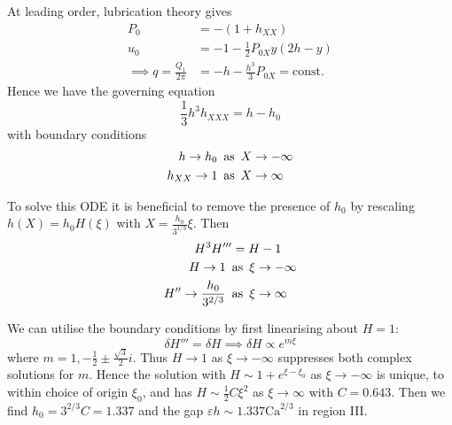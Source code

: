\documentclass{jknotes}
\begin{document}
\begin{center}
\end{center}
At leading order, lubrication theory gives
\begin{align}
	P_0 &= -(1+h_{XX}) \\
	u_0 &= -1 - \frac{1}{2} P_{0X} y(2h-y) \\
	\implies q = \frac{Q_1}{2\pi} &= -h-\frac{h^3}{3}P_{0X} = \text{const.}
\end{align}
Hence we have the governing equation
\begin{equation}
	\frac{1}{3} h^3 h_{XXX} = h-h_0
\end{equation}
with boundary conditions
\begin{align}
	h \to h_0 \hspace{.5em}&\text{as}\hspace{.5em} X \to -\infty \\
	h_{XX} \to 1\hspace{.5em} &\text{as}\hspace{.5em} X \to \infty \\
\end{align}

To solve this ODE it is beneficial to remove the presence of $h_0$ by
rescaling $h(X) = h_0 H(\xi)$ with $X = \frac{h_0}{3^{1/3}}\xi$. Then
\begin{align}
	H^3 H''' &= H-1 \\
	H \to 1 \hspace{.5em}&\text{as}\hspace{.5em} \xi \to -\infty \\
	H'' \to \frac{h_0}{3^{2/3}} \hspace{.5em}&\text{as}\hspace{.5em} \xi \to \infty
\end{align}

We can utilise the boundary conditions by first linearising about $H=1$:
\begin{equation}
	\delta H''' = \delta H \implies \delta H \propto e^{m\xi}
\end{equation}
where $m = 1, -\frac{1}{2} \pm \frac{\sqrt{3}}{2}i$. Thus $H \to 1$ as $\xi
\to -\infty$ suppresses both complex solutions for $m$. Hence the solution
with $H \sim 1 + e^{\xi-\xi_0}$ as $\xi \to -\infty$ is unique, to within
choice of origin $\xi_0$, and has $H \sim \frac{1}{2}C\xi^2$ as $\xi \to
\infty$ with $C = 0.643$. Then we find $h_0 = 3^{2/3}C = 1.337$ and the gap
$\varepsilon h \sim 1.337 \text{Ca}^{2/3}$ in region III.
\end{document}
